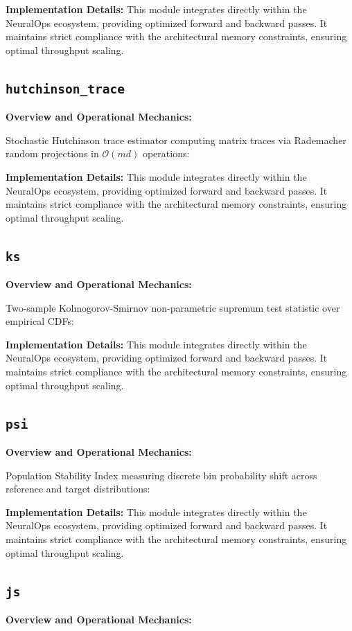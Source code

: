\documentclass[10pt,twocolumn,letterpaper]{article}
\begin{document}
\textbf{Implementation Details:}
This module integrates directly within the NeuralOps ecosystem, providing optimized forward and backward passes. It maintains strict compliance with the architectural memory constraints, ensuring optimal throughput scaling.

\subsection{\texttt{hutchinson\_trace}}
\textbf{Overview and Operational Mechanics:}

Stochastic Hutchinson trace estimator computing matrix traces via Rademacher random projections in $\mathcal{O}(m d)$ operations:

\textbf{Implementation Details:}
This module integrates directly within the NeuralOps ecosystem, providing optimized forward and backward passes. It maintains strict compliance with the architectural memory constraints, ensuring optimal throughput scaling.

\subsection{\texttt{ks}}
\textbf{Overview and Operational Mechanics:}

Two-sample Kolmogorov-Smirnov non-parametric supremum test statistic over empirical CDFs:

\textbf{Implementation Details:}
This module integrates directly within the NeuralOps ecosystem, providing optimized forward and backward passes. It maintains strict compliance with the architectural memory constraints, ensuring optimal throughput scaling.

\subsection{\texttt{psi}}
\textbf{Overview and Operational Mechanics:}

Population Stability Index measuring discrete bin probability shift across reference and target distributions:

\textbf{Implementation Details:}
This module integrates directly within the NeuralOps ecosystem, providing optimized forward and backward passes. It maintains strict compliance with the architectural memory constraints, ensuring optimal throughput scaling.

\subsection{\texttt{js}}
\textbf{Overview and Operational Mechanics:}
\end{document}
